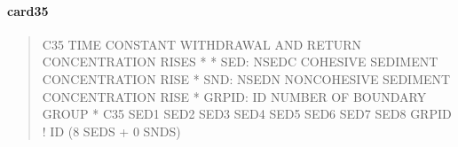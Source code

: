 \documentclass[letterpaper,10pt,english]{sphinxmanual}
\begin{document}
\paragraph{card35}
\label{\detokenize{inputfiles/runcontrol/card35:card35}}\label{\detokenize{inputfiles/runcontrol/card35::doc}}\begin{quote}

\begin{sphinxVerbatim}[commandchars=\\\{\}]
\PYGZhy{}\PYGZhy{}\PYGZhy{}\PYGZhy{}\PYGZhy{}\PYGZhy{}\PYGZhy{}\PYGZhy{}\PYGZhy{}\PYGZhy{}\PYGZhy{}\PYGZhy{}\PYGZhy{}\PYGZhy{}\PYGZhy{}\PYGZhy{}\PYGZhy{}\PYGZhy{}\PYGZhy{}\PYGZhy{}\PYGZhy{}\PYGZhy{}\PYGZhy{}\PYGZhy{}\PYGZhy{}\PYGZhy{}\PYGZhy{}\PYGZhy{}\PYGZhy{}\PYGZhy{}\PYGZhy{}\PYGZhy{}\PYGZhy{}\PYGZhy{}\PYGZhy{}\PYGZhy{}\PYGZhy{}\PYGZhy{}\PYGZhy{}\PYGZhy{}\PYGZhy{}\PYGZhy{}\PYGZhy{}\PYGZhy{}\PYGZhy{}\PYGZhy{}\PYGZhy{}\PYGZhy{}\PYGZhy{}\PYGZhy{}\PYGZhy{}\PYGZhy{}\PYGZhy{}\PYGZhy{}\PYGZhy{}\PYGZhy{}\PYGZhy{}\PYGZhy{}\PYGZhy{}\PYGZhy{}\PYGZhy{}\PYGZhy{}\PYGZhy{}\PYGZhy{}\PYGZhy{}\PYGZhy{}\PYGZhy{}\PYGZhy{}\PYGZhy{}\PYGZhy{}\PYGZhy{}\PYGZhy{}\PYGZhy{}\PYGZhy{}\PYGZhy{}\PYGZhy{}\PYGZhy{}\PYGZhy{}
C35 TIME CONSTANT WITHDRAWAL AND RETURN CONCENTRATION RISES
*
*   SED\PYGZsh{}:  NSEDC COHESIVE SEDIMENT CONCENTRATION RISE
*   SND\PYGZsh{}:  NSEDN NON\PYGZhy{}COHESIVE SEDIMENT CONCENTRATION RISE
*  GRPID:  ID NUMBER OF BOUNDARY GROUP
*
C35      SED1      SED2      SED3      SED4      SED5      SED6      SED7      SED8      GRPID ! ID (8 SEDS + 0 SNDS)
\end{sphinxVerbatim}
\end{quote}
\end{document}
